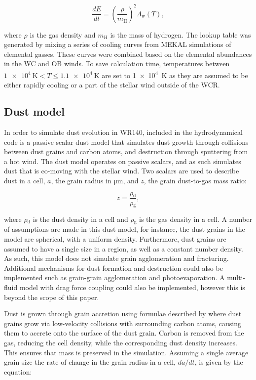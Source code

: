 \documentclass[fleqn,usenatbib]{mnras}
\newcommand{\rms}[1]{\ensuremath{_{\text{#1}}}}
\begin{document}
\begin{equation}
  \frac{dE}{dt} = \left(\frac{\rho}{m\rms{H}}\right)^2 \Lambda\rms{w}(T),
\end{equation}

\noindent
where $\rho$ is the gas density and $m\rms{H}$ is the mass of hydrogen.
The lookup table was generated by mixing a series of cooling curves from MEKAL simulations of elemental gasses.
These curves were combined based on the elemental abundances in the WC and OB winds.
To save calculation time, temperatures between $\SI{1e4}{\kelvin} < T \leq \SI{1.1e4}{\kelvin}$ are set to \SI{1e4}{\kelvin} as they are assumed to be either rapidly cooling or a part of the stellar wind outside of the WCR.

\subsection{Dust model}
\label{sec:dust-model}

In order to simulate dust evolution in WR140, included in the hydrodynamical code is a passive scalar dust model that simulates dust growth through collisions between dust grains and carbon atoms, and destruction through sputtering from a hot wind.
The dust model operates on passive scalars, and as such simulates dust that is co-moving with the stellar wind.
Two scalars are used to describe dust in a cell, $a$, the grain radius in \si{\micro\metre}, and $z$, the grain dust-to-gas mass ratio:

\begin{equation}
  z = \frac{\rho\rms{d}}{\rho\rms{g}},
\end{equation}

\noindent
where $\rho\rms{d}$ is the dust density in a cell and $\rho\rms{g}$ is the gas density in a cell.
A number of assumptions are made in this dust model, for instance, the dust grains in the model are spherical, with a uniform density.
Furthermore, dust grains are assumed to have a single size in a region, as well as a constant number density.
As such, this model does not simulate grain agglomeration and fracturing.
Additional mechanisms for dust formation and destruction could also be implemented such as grain-grain agglomeration and photoevaporation.
A multi-fluid model with drag force coupling could also be implemented, however this is beyond the scope of this paper.

Dust is grown through grain accretion using formulae described by \citep{spitzer_jr._physical_2008} where dust grains grow via low-velocity collisions with surrounding carbon atoms, causing them to accrete onto the surface of the dust grain.
Carbon is removed from the gas, reducing the cell density, while the corresponding dust density increases.
This ensures that mass is preserved in the simulation.
Assuming a single average grain size the rate of change in the grain radius in a cell, $da/dt$, is given by the equation:
\end{document}
